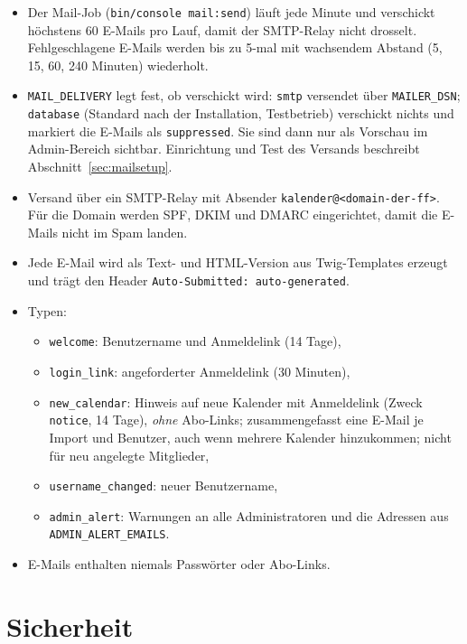 \documentclass[a4paper,fontsize=10pt]{scrartcl}
\newcommand{\code}[1]{\texttt{#1}}
\begin{document}
\begin{itemize}
  \item Der Mail-Job (\code{bin/console mail:send}) läuft jede Minute und
        verschickt höchstens 60 E-Mails pro Lauf, damit der SMTP-Relay nicht
        drosselt. Fehlgeschlagene E-Mails werden bis zu 5-mal mit
        wachsendem Abstand (5, 15, 60, 240 Minuten) wiederholt.
  \item \code{MAIL\_DELIVERY} legt fest, ob verschickt wird:
        \code{smtp} versendet über \code{MAILER\_DSN};
        \code{database} (Standard nach der Installation, Testbetrieb)
        verschickt nichts und markiert die E-Mails als \code{suppressed}.
        Sie sind dann nur als Vorschau im Admin-Bereich sichtbar.
        Einrichtung und Test des Versands beschreibt
        Abschnitt~\ref{sec:mailsetup}.
  \item Versand über ein SMTP-Relay mit Absender
        \code{kalender@<domain-der-ff>}. Für die Domain werden SPF, DKIM
        und DMARC eingerichtet, damit die E-Mails nicht im Spam landen.
  \item Jede E-Mail wird als Text- und HTML-Version aus Twig-Templates
        erzeugt und trägt den Header \code{Auto-Submitted: auto-generated}.
  \item Typen:
    \begin{itemize}
      \item \code{welcome}: Benutzername und Anmeldelink (14 Tage),
      \item \code{login\_link}: angeforderter Anmeldelink (30 Minuten),
      \item \code{new\_calendar}: Hinweis auf neue Kalender mit Anmeldelink
            (Zweck \code{notice}, 14 Tage), \emph{ohne} Abo-Links;
            zusammengefasst eine E-Mail je Import und Benutzer, auch wenn
            mehrere Kalender hinzukommen; nicht für neu angelegte Mitglieder,
      \item \code{username\_changed}: neuer Benutzername,
      \item \code{admin\_alert}: Warnungen an alle Administratoren und die
            Adressen aus \code{ADMIN\_ALERT\_EMAILS}.
    \end{itemize}
  \item E-Mails enthalten niemals Passwörter oder Abo-Links.
\end{itemize}

\section{Sicherheit}\label{sec:sicherheit}
\end{document}
